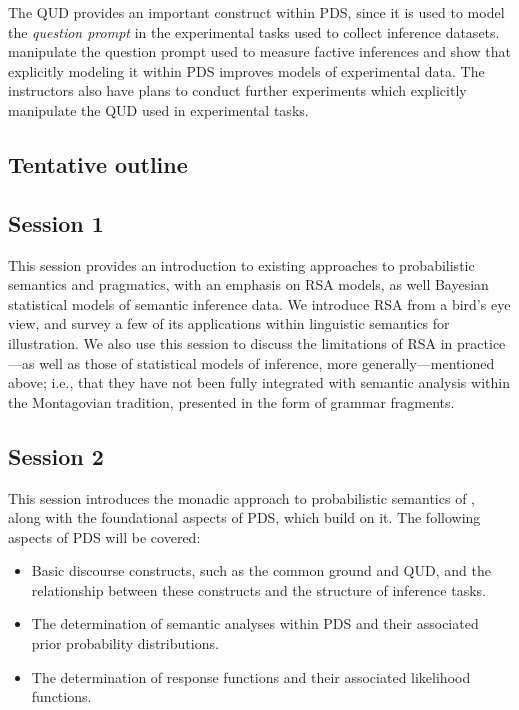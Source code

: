 \documentclass[nobib,nohyper]{tufte-handout}
\begin{document}
The QUD provides an important construct within PDS, since it is used to model the \emph{question prompt} in the experimental tasks used to collect inference datasets.
\textcite{grove_modeling_2025} manipulate the question prompt used to measure factive inferences and show that explicitly modeling it within PDS improves models of experimental data.
The instructors also have plans to conduct further experiments which explicitly manipulate the QUD used in experimental tasks.

\subsection{Tentative outline}

\subsection{Session 1}

This session provides an introduction to existing approaches to probabilistic semantics and pragmatics, with an emphasis on RSA models, as well Bayesian statistical models of semantic inference data.
We introduce RSA from a bird's eye view, and survey a few of its applications within linguistic semantics for illustration.
We also use this session to discuss the limitations of RSA in practice---as well as those of statistical models of inference, more generally---mentioned above;
i.e., that they have not been fully integrated with semantic analysis within the Montagovian tradition, presented in the form of grammar fragments.

\subsection{Session 2}

This session introduces the monadic approach to probabilistic semantics of \textcite{grove_probabilistic_2023}, along with the foundational aspects of PDS, which build on it.
The following aspects of PDS will be covered:
\begin{itemize}
\item Basic discourse constructs, such as the common ground and QUD, and the relationship between these constructs and the structure of inference tasks.
\item The determination of semantic analyses within PDS and their associated prior probability distributions.
\item The determination of response functions and their associated likelihood functions.
\end{itemize}
 
\end{document}
